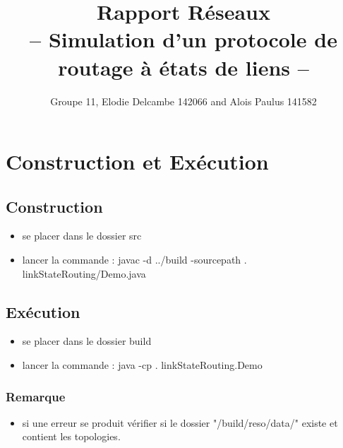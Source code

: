 \documentclass[a4paper, 12pt]{article}
\title{Rapport Réseaux \\ -- Simulation d'un protocole de routage à états de liens --}
\author{Groupe 11, Elodie Delcambe 142066 and Alois Paulus 141582 }
\begin{document}
\maketitle

\tableofcontents

\newpage

\section{Construction et Exécution}
\subsection{Construction}
\begin{itemize}
\item se placer dans le dossier src
\item lancer la commande : javac -d ../build -sourcepath . linkStateRouting/Demo.java
\end{itemize}

\subsection{Exécution}

\begin{itemize}
\item se placer dans le dossier build
\item lancer la commande : java -cp . linkStateRouting.Demo
\end{itemize}

\subsubsection{Remarque}
\begin{itemize}
\item si une erreur se produit vérifier si le dossier "/build/reso/data/" existe et contient les topologies.
\end{itemize}
\end{document}
